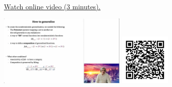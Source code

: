
\begin{minipage}{10cm}
    \href{https://act4e-spring21.netlify.app/videos/spring2021-monads-a:how-to-gen-monads.html}{Watch online video (3 minutes).}
        
    \href{https://act4e-spring21.netlify.app/videos/spring2021-monads-a:how-to-gen-monads.html}{\includegraphics[height=3.5cm]{spring2021-monads-a:how-to-gen-monads/thumbnails.jpg}}
    \href{https://act4e-spring21.netlify.app/videos/spring2021-monads-a:how-to-gen-monads.html}{\includegraphics[height=2.5cm]{spring2021-monads-a:how-to-gen-monads/qrcode.png}}
\end{minipage}
